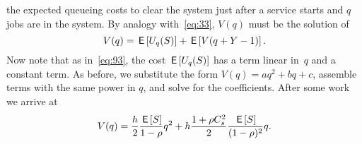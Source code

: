 




 the expected queueing costs to clear the system just after a service starts and  $q$ jobs are in the system.
By analogy with~\cref{eq:33}, $V(q)$ must be the solution of
\begin{equation}  \label{eq:98}
  V(q) = \,\mathsf{E}\left[U_{q}(S)\right] + \,\mathsf{E}\left[V(q+Y-1)\right].
\end{equation}
Now note that as in~\cref{eq:93}, the cost $\,\mathsf{E}\left[U_{q}(S)\right]$ has a term linear in~$q$ and a constant term.
As before, we substitute the form $V(q) = aq^2 + bq+c$, assemble terms with the same power in $q$, and solve for the coefficients.
After some work we arrive at
\begin{align*}
  V(q) = \frac{h}{2}\frac{\,\mathsf{E}\left[S\right]}{1-\rho} q^2 + h  \frac{ 1+ \rho C_s^2}2 \frac{\,\mathsf{E}\left[S\right]}{(1-\rho)^2} q.
\end{align*}

